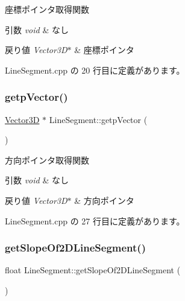 座標ポインタ取得関数 


\begin{DoxyParams}{引数}
{\em void} & なし \\
\hline
\end{DoxyParams}

\begin{DoxyRetVals}{戻り値}
{\em Vector3\+D$\ast$} & 座標ポインタ \\
\hline
\end{DoxyRetVals}


 Line\+Segment.\+cpp の 20 行目に定義があります。

\mbox{\label{class_line_segment_a773f1be1684f80f3f1ed6623462f76c6}} 
\subsubsection{\texorpdfstring{getp\+Vector()}{getpVector()}}
{\footnotesize\ttfamily \mbox{\hyperlink{class_vector3_d}{Vector3D}} $\ast$ Line\+Segment\+::getp\+Vector (\begin{DoxyParamCaption}{ }\end{DoxyParamCaption})}



方向ポインタ取得関数 


\begin{DoxyParams}{引数}
{\em void} & なし \\
\hline
\end{DoxyParams}

\begin{DoxyRetVals}{戻り値}
{\em Vector3\+D$\ast$} & 方向ポインタ \\
\hline
\end{DoxyRetVals}


 Line\+Segment.\+cpp の 27 行目に定義があります。

\mbox{\label{class_line_segment_a473738a0b67e449cf8b5a23f1146f446}} 
\subsubsection{\texorpdfstring{get\+Slope\+Of2\+D\+Line\+Segment()}{getSlopeOf2DLineSegment()}}
{\footnotesize\ttfamily float Line\+Segment\+::get\+Slope\+Of2\+D\+Line\+Segment (\begin{DoxyParamCaption}{ }\end{DoxyParamCaption})}



